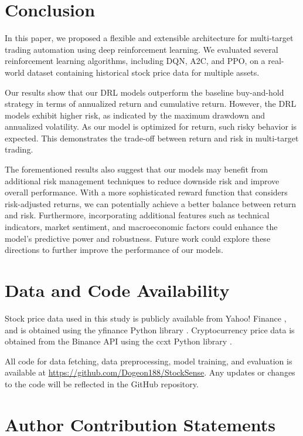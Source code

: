 \documentclass[conference]{IEEEtran}
\begin{document}
\section{Conclusion}

In this paper, we proposed a flexible and extensible architecture for multi-target trading automation using deep reinforcement learning. We evaluated several reinforcement learning algorithms, including DQN, A2C, and PPO, on a real-world dataset containing historical stock price data for multiple assets.

Our results show that our DRL models outperform the baseline buy-and-hold strategy in terms of annualized return and cumulative return. However, the DRL models exhibit higher risk, as indicated by the maximum drawdown and annualized volatility. As our model is optimized for return, such risky behavior is expected. This demonstrates the trade-off between return and risk in multi-target trading.

The forementioned results also suggest that our models may benefit from additional risk management techniques to reduce downside risk and improve overall performance. With a more sophisticated reward function that considers risk-adjusted returns, we can potentially achieve a better balance between return and risk. Furthermore, incorporating additional features such as technical indicators, market sentiment, and macroeconomic factors could enhance the model's predictive power and robustness. Future work could explore these directions to further improve the performance of our models.

\section{Data and Code Availability}

Stock price data used in this study is publicly available from Yahoo! Finance \cite{yahoofinance}, and is obtained using the yfinance Python library \cite{yfinance}. Cryptocurrency price data is obtained from the Binance API \cite{binanceapi} using the ccxt Python library \cite{ccxt}.

All code for data fetching, data preprocessing, model training, and evaluation is available at \url{https://github.com/Dogeon188/StockSense}. Any updates or changes to the code will be reflected in the GitHub repository.

\section{Author Contribution Statements}
\end{document}
